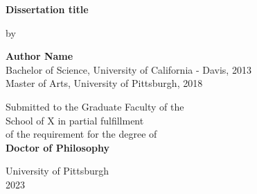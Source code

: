 
   \begin{center}
        \begin{singlespace}
            \textbf{Dissertation title}
        \end{singlespace}
        
       \vspace*{7\baselineskip}
        by
            
        \textbf{Author Name}\\
        Bachelor of Science, University of California - Davis, 2013\\
        Master of Arts, University of Pittsburgh, 2018\\
        
       \vspace*{8\baselineskip}
        
        Submitted to the Graduate Faculty of the\\
        School of X in partial fulfillment\\
        of the requirement for the degree of\\
        \textbf{Doctor of Philosophy}
            
       \vspace*{3\baselineskip}

        University of Pittsburgh\\ 
        2023
    \end{center}

	
	
